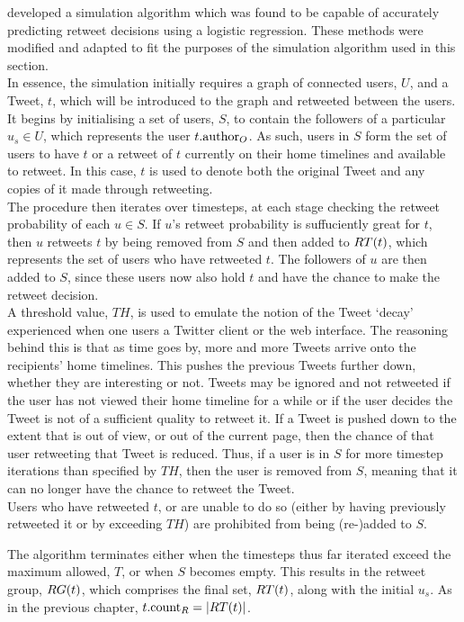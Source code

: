 \cite{zhu11} developed a simulation algorithm which was found to be capable of accurately predicting retweet decisions using a logistic regression. These methods were modified and adapted to fit the purposes of the simulation algorithm used in this section.\\
In essence, the simulation initially requires a graph of connected users, $U$, and a Tweet, $t$, which will be introduced to the graph and retweeted between the users. It begins by initialising a set of users, $S$, to contain the followers of a particular $u_s \in U$, which represents the user $t.\textrm{author}_O$. As such, users in $S$ form the set of users to have $t$ or a retweet of $t$ currently on their home timelines and available to retweet. In this case, $t$ is used to denote both the original Tweet and any copies of it made through retweeting.\\
The procedure then iterates over timesteps, at each stage checking the retweet probability of each $u \in S$. If $u$'s retweet probability is suffuciently great for $t$, then $u$ retweets $t$ by being removed from $S$ and then added to $RT(t)$, which represents the set of users who have retweeted $t$. The followers of $u$ are then added to $S$, since these users now also hold $t$ and have the chance to make the retweet decision.\\
A threshold value, $TH$, is used to emulate the notion of the Tweet `decay' experienced when one users a Twitter client or the web interface. The reasoning behind this is that as time goes by, more and more Tweets arrive onto the recipients' home timelines. This pushes the previous Tweets further down, whether they are interesting or not. Tweets may be ignored and not retweeted if the user has not viewed their home timeline for a while or if the user decides the Tweet is not of a sufficient quality to retweet it. If a Tweet is pushed down to the extent that is out of view, or out of the current page, then the chance of that user retweeting that Tweet is reduced. Thus, if a user is in $S$ for more timestep iterations than specified by $TH$, then the user is removed from $S$, meaning that it can no longer have the chance to retweet the Tweet.\\
Users who have retweeted $t$, or are unable to do so (either by having previously retweeted it or by exceeding $TH$) are prohibited from being (re-)added to $S$.

The algorithm terminates either when the timesteps thus far iterated exceed the maximum allowed, $T$, or when $S$ becomes empty. This results in the retweet group, $RG(t)$, which comprises the final set, $RT(t)$, along with the initial $u_s$. As in the previous chapter, $t.\textrm{count}_R = |RT(t)|$.

